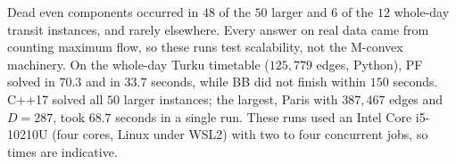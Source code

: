 Dead even components occurred in $48$ of the $50$ larger and $6$ of the $12$ whole-day transit instances, and rarely elsewhere. Every \NO{} answer on real data came from counting maximum flow, so these runs test scalability, not the M-convex machinery. On the whole-day Turku timetable ($125{,}779$ edges, Python), PF solved \FIX{} in $70.3$ and \FREE{} in $33.7$ seconds, while BB did not finish within $150$ seconds. C++17 solved all $50$ larger instances; the largest, Paris \FIX{} with $387{,}467$ edges and $D=287$, took $68.7$ seconds in a single run. These runs used an Intel Core i5-10210U (four cores, Linux under WSL2) with two to four concurrent jobs, so times are indicative.

\FloatBarrier
